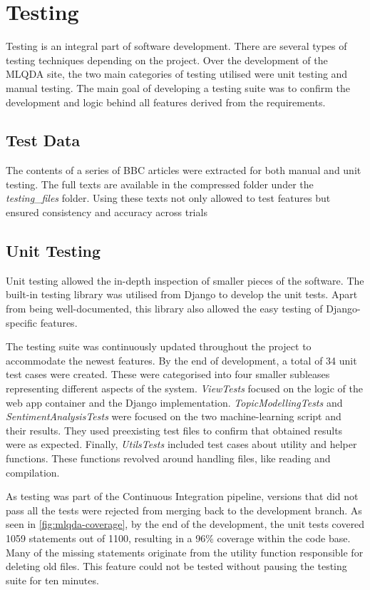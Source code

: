 \documentclass{l4proj}
\begin{document}
\section{Testing}
Testing is an integral part of software development. There are several types of testing techniques depending on the project. Over the development of the MLQDA site, the two main categories of testing utilised were unit testing and manual testing. The main goal of developing a testing suite was to confirm the development and logic behind all features derived from the requirements.

\subsection{Test Data}
The contents of a series of BBC articles were extracted for both manual and unit testing. The full texts are available in the compressed folder under the \textit{testing\_files} folder. Using these texts not only allowed to test features but ensured consistency and accuracy across trials
\subsection{Unit Testing}
Unit testing allowed the in-depth inspection of smaller pieces of the software. The built-in testing library was utilised from Django to develop the unit tests. Apart from being well-documented, this library also allowed the easy testing of Django-specific features.

The testing suite was continuously updated throughout the project to accommodate the newest features. By the end of development, a total of 34 unit test cases were created. These were categorised into four smaller subleases representing different aspects of the system. \textit{ViewTests} focused on the logic of the web app container and the Django implementation. \textit{TopicModellingTests} and \textit{SentimentAnalysisTests} were focused on the two machine-learning script and their results. They used preexisting test files to confirm that obtained results were as expected. Finally, \textit{UtilsTests} included test cases about utility and helper functions. These functions revolved around handling files, like reading and compilation.

As testing was part of the Continuous Integration pipeline, versions that did not pass all the tests were rejected from merging back to the development branch. As seen in \ref{fig:mlqda-coverage}, by the end of the development, the unit tests covered 1059 statements out of 1100, resulting in a 96\% coverage within the code base. Many of the missing statements originate from the utility function responsible for deleting old files. This feature could not be tested without pausing the testing suite for ten minutes.
\end{document}
